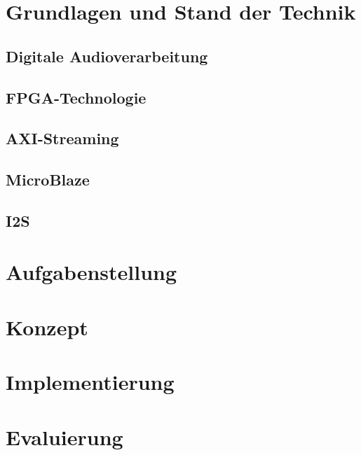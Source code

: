 \documentclass[12pt,a4paper,bibliography=totoc,listof=totoc]{scrartcl}
\begin{document}
\section{Grundlagen und Stand der Technik}

\subsection{Digitale Audioverarbeitung}
\subsection{FPGA-Technologie}
\subsection{AXI-Streaming}
\subsection{MicroBlaze}
\subsection{I2S}

\pagebreak
\section{Aufgabenstellung}

\section{Konzept}

\section{Implementierung}

\pagebreak

\section{Evaluierung}

\pagebreak
\end{document}
